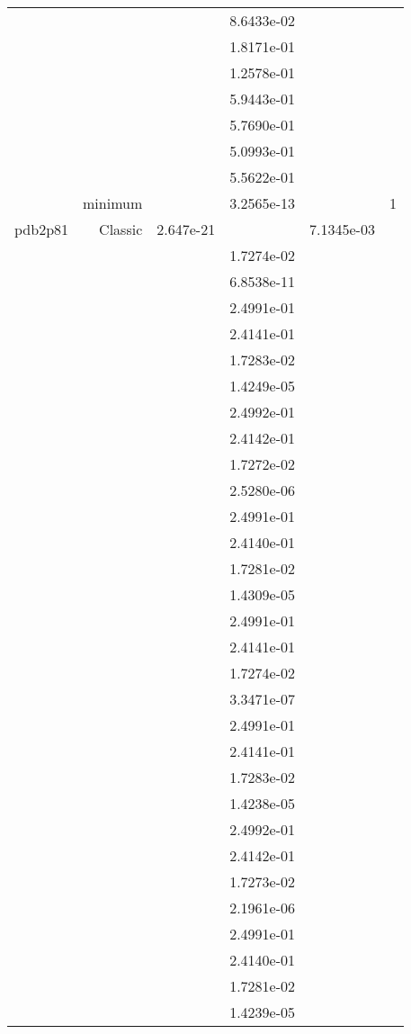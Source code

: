 \begin{xltabular}{\textwidth}{r|rS[table-format=1.3e+2]S[table-format=1.4e+2]S[table-format=1.4e+2]S[table-format=-1.5]}
&  &  & 8.6433e-02 & & \\
&  &  & 1.8171e-01 & & \\
&  &  & 1.2578e-01 & & \\
&  &  & 5.9443e-01 & & \\
&  &  & 5.7690e-01 & & \\
&  &  & 5.0993e-01 & & \\
&  &  & 5.5622e-01 & & \\
& minimum &  & 3.2565e-13 & & 1 \\  \addlinespace
pdb2p81 & Classic & 2.647e-21 &  & 7.1345e-03 & \\
&  &  & 1.7274e-02 & & \\
&  &  & 6.8538e-11 & & \\
&  &  & 2.4991e-01 & & \\
&  &  & 2.4141e-01 & & \\
&  &  & 1.7283e-02 & & \\
&  &  & 1.4249e-05 & & \\
&  &  & 2.4992e-01 & & \\
&  &  & 2.4142e-01 & & \\
&  &  & 1.7272e-02 & & \\
&  &  & 2.5280e-06 & & \\
&  &  & 2.4991e-01 & & \\
&  &  & 2.4140e-01 & & \\
&  &  & 1.7281e-02 & & \\
&  &  & 1.4309e-05 & & \\
&  &  & 2.4991e-01 & & \\
&  &  & 2.4141e-01 & & \\
&  &  & 1.7274e-02 & & \\
&  &  & 3.3471e-07 & & \\
&  &  & 2.4991e-01 & & \\
&  &  & 2.4141e-01 & & \\
&  &  & 1.7283e-02 & & \\
&  &  & 1.4238e-05 & & \\
&  &  & 2.4992e-01 & & \\
&  &  & 2.4142e-01 & & \\
&  &  & 1.7273e-02 & & \\
&  &  & 2.1961e-06 & & \\
&  &  & 2.4991e-01 & & \\
&  &  & 2.4140e-01 & & \\
&  &  & 1.7281e-02 & & \\
&  &  & 1.4239e-05 & & \\

\end{xltabular}
